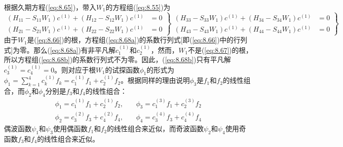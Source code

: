 \begin{examplebox}
        根据久期方程(\ref{eq:8.65})，带入$W_1$的方程组(\ref{eq:8.55})为
        \begin{subequations}
            \label{eq:8.68}
            \begin{equation}
                \left. \begin{aligned}
                    \left(H_{11} - S_{11}W_1\right)c^{\left(1\right)} + \left(H_{12} - S_{12}W_1\right)c^{\left(1\right)} &= 0 \\
                    \left(H_{21} - S_{21}W_1\right)c^{\left(1\right)} + \left(H_{22} - S_{22}W_1\right)c^{\left(1\right)} &= 0
                \end{aligned} \right\}
                \tag{8.68a}
                \label{eq:8.68a}
            \end{equation}
            \begin{equation}
                \left. \begin{aligned}
                    \left(H_{33} - S_{33}W_1\right)c^{\left(1\right)} + \left(H_{34} - S_{34}W_1\right)c^{\left(1\right)} &= 0 \\
                    \left(H_{43} - S_{43}W_1\right)c^{\left(1\right)} + \left(H_{44} - S_{44}W_1\right)c^{\left(1\right)} &= 0
                \end{aligned} \right\}
                \tag{8.68b}
                \label{eq:8.68b}
            \end{equation}
        \end{subequations}
        由于$W_1$是(\ref{eq:8.66})的根，方程组(\ref{eq:8.68a})的系数行列式[即(\ref{eq:8.66})中的行列式]为零。那么(\ref{eq:8.68a})有非平凡解$c_1^{\left(1\right)}$和$c_2^{\left(1\right)}$，然而，$W_1$不是(\ref{eq:8.67})的根，所以方程组(\ref{eq:8.68b})的系数行列式不为零。因此，(\ref{eq:8.68b})只有平凡解$c_3^{\left(1\right)} = c_4^{\left(1\right)} = 0$。则对应于根$W_1$的试探函数$\phi_1$的形式为$\phi_1 = \sum_{k=1}^{4}c_k^{\left(1\right)}f_k = c_1^{\left(1\right)}f_1 + c_2^{\left(1\right)}f_2$。根据同样的理由说明$\phi_3$是$f_1$和$f_2$的线性组合，而$\phi_2$和$\phi_4$分别是$f_3$和$f_4$的线性组合：
        \begin{equation}
            \begin{aligned}
                \phi_1 = c_1^{\left(1\right)}f_1 + c_2^{\left(1\right)}f_2, \quad & \phi_3 = c_1^{\left(3\right)}f_1 + c_2^{\left(3\right)}f_2 \\
                \phi_2 = c_3^{\left(2\right)}f_3 + c_4^{\left(2\right)}f_4, \quad & \phi_4 = c_3^{\left(4\right)}f_3 + c_4^{\left(4\right)}f_4
            \end{aligned}
            \label{eq:8.69}
        \end{equation}
        偶波函数$\psi_1$和$\psi_3$使用偶函数$f_1$和$f_2$的线性组合来近似，而奇波函数$\psi_2$和$\psi_4$使用奇函数$f_3$和$f_4$的线性组合来近似。


\end{examplebox}
